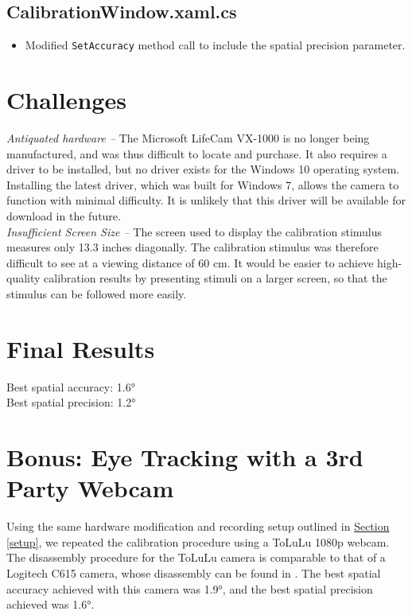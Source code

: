 \documentclass[11pt]{article}
\begin{document}
\subsection*{CalibrationWindow.xaml.cs}
    \begin{itemize}
        \item Modified \texttt{SetAccuracy} method call to include the spatial precision parameter.
    \end{itemize}

\section{Challenges} %
\textit{Antiquated hardware -- }The Microsoft LifeCam VX-1000 is no longer being manufactured, and was thus difficult to locate and purchase. It also requires a driver to be installed, but no driver exists for the Windows 10 operating system. Installing the latest driver, which was built for Windows 7, allows the camera to function with minimal difficulty. It is unlikely that this driver will be available for download in the future. \\
\textit{Insufficient Screen Size -- } The screen used to display the calibration stimulus measures only 13.3 inches diagonally. The calibration stimulus was therefore difficult to see at a viewing distance of 60 cm. It would be easier to achieve high-quality calibration results by presenting stimuli on a larger screen, so that the stimulus can be followed more easily.
\section{Final Results} %
Best spatial accuracy: \ang{1.6} \\
Best spatial precision: \ang{1.2}

\section{Bonus: Eye Tracking with a 3rd Party Webcam}
Using the same hardware modification and recording setup outlined in \hyperref[setup]{Section \ref{setup}}, we repeated the calibration procedure using a ToLuLu 1080p webcam. The disassembly procedure for the ToLuLu camera is comparable to that of a Logitech C615 camera, whose disassembly can be found in \cite{Burns}. The best spatial accuracy achieved with this camera was \ang{1.9}, and the best spatial precision achieved was \ang{1.6}.


\end{document}

